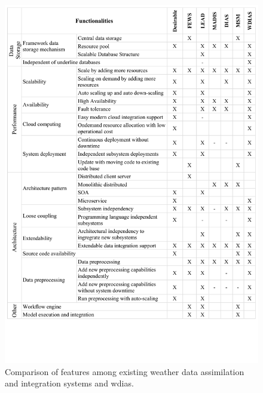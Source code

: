 \begin{figure}[htp]
    \centering
    \includegraphics[width=1.05\textwidth]{method/misc/architecture_comparison_pros_cons.pdf}
    \caption{Comparison of features among existing weather data assimilation and integration systems and \acrshort{wdias}. %
    }
    \label{fi:architecture_comparison}
\end{figure}

